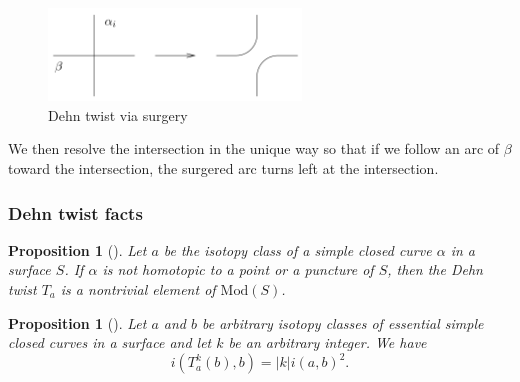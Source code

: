 \documentclass[reqno]{amsart}
\newtheorem{proposition}[theorem]{Proposition}
\theoremstyle{definition}
\theoremstyle{remark}
\newcommand{\Mod}{{\mathrm{Mod}}}
\begin{document}
\begin{figure}[H]
    \centering
    \includegraphics[width=0.6\textwidth]{dehn-twist-via-surgery.png}
    \caption{Dehn twist via surgery}
    \label{fig:dehn-twist-via-surgery-png}
\end{figure}

We then resolve the intersection in the unique way so that
if we follow an arc of $\beta$ toward the intersection, the 
surgered arc turns left at the intersection.



\subsubsection{Dehn twist facts}


\begin{proposition}[]
    Let $a$ be the isotopy class of a simple closed curve
    $\alpha$ in a surface $S$. If $\alpha$ is not
    homotopic to a point or a puncture of $S$, then the
    Dehn twist $T_a$ is a nontrivial element of $\Mod(S)$.
\end{proposition}

\begin{proposition}[]\label{dehn-twist-formula}
    Let $a$ and $b$ be arbitrary isotopy classes of essential
    simple closed curves in a surface and let $k$ be
    an arbitrary integer. We have
    \[
    i \left( T_{a}^{k}(b), b \right) =
    \left| k \right| i\left( a,b \right)^2.
    \] 
\end{proposition}
\end{document}
